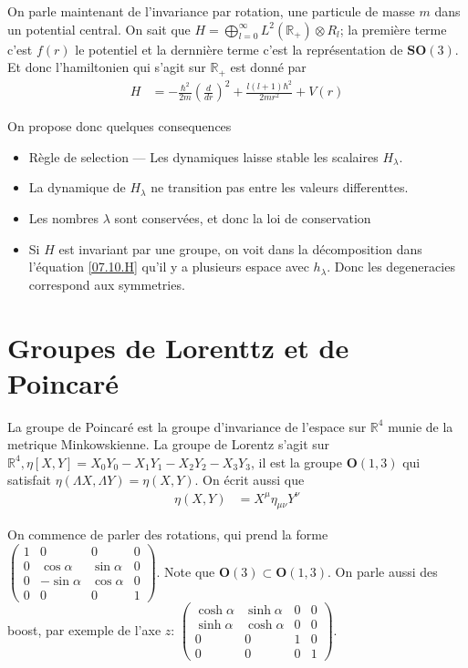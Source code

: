 \documentclass[10pt]{report}
\newcommand{\rd}[2]{\frac{d#1}{d#2}}
\begin{document}
On parle maintenant de l'invariance par rotation, une particule de masse $m$ dans un potential central. On sait que $H = \bigoplus_{l=0}^\infty L^2\left( \mathbb{R}_+ \right)\otimes R_l$; la premi\`ere terme c'est $f(r)$ le potentiel et la dernni\`ere terme c'est la repr\'esentation de $\mathbf{SO}(3)$. Et donc l'hamiltonien qui s'agit sur $\mathbb{R}_+$ est donn\'e par
\begin{align}
    H &= -\frac{\hbar^2}{2m}\left( \rd{}{r} \right)^2 + \frac{l(l+1)\hbar^2}{2mr^2} + V(r)
\end{align}

On propose donc quelques consequences
\begin{itemize}
    \item R\`egle de selection --- Les dynamiques laisse stable les scalaires $H_\lambda$.
    \item La dynamique de $H_\lambda$ ne transition pas entre les valeurs differenttes.
    \item Les nombres $\lambda$ sont conserv\'ees, et donc la loi de conservation
    \item Si $H$ est invariant par une groupe, on voit dans la d\'ecomposition dans l'\'equation \eqref{07.10.H} qu'il y a plusieurs espace avec $h_\lambda$. Donc les degeneracies correspond aux symmetries.
\end{itemize}

\section{Groupes de Lorenttz et de Poincar\'e}

La groupe de Poincar\'e est la groupe d'invariance de l'espace sur $\mathbb{R}^4$ munie de la metrique Minkowskienne. La groupe de Lorentz s'agit sur $\mathbb{R}^4, \eta\left[ X,Y \right] = X_0Y_0 - X_1Y_1 - X_2Y_2 - X_3Y_3$, il est la groupe $\mathbf{O}(1,3)$ qui satisfait $\eta(\Lambda X, \Lambda Y) = \eta(X,Y)$. On \'ecrit aussi que
\begin{align}
    \eta(X,Y) &= X^\mu\eta_{\mu \nu}Y^\nu
\end{align}

On commence de parler des rotations, qui prend la forme $\begin{pmatrix} 1 & 0 & 0 & 0\\0 & \cos \alpha & \sin\alpha & 0 \\ 0 & -\sin\alpha & \cos\alpha & 0 \\ 0 & 0 & 0 & 1 \end{pmatrix} $. Note que $\mathbf{O}(3) \subset \mathbf{O}(1,3)$. On parle aussi des boost, par exemple de l'axe $z$: $\begin{pmatrix} \cosh\alpha & \sinh\alpha & 0 & 0 \\ \sinh \alpha & \cosh\alpha & 0 & 0 \\ 0 & 0 & 1 & 0\\0 & 0 & 0 & 1 \end{pmatrix}$. 
\end{document}

